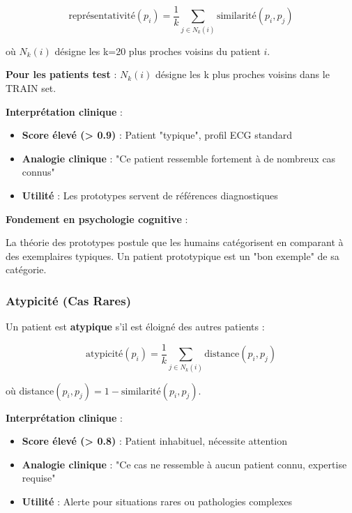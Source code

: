 \documentclass[12pt,a4paper]{article}
\begin{document}
\begin{equation}
\text{représentativité}(p_i) = \frac{1}{k} \sum_{j \in N_k(i)} \text{similarité}(p_i, p_j)
\end{equation}

où $N_k(i)$ désigne les k=20 plus proches voisins du patient $i$.

\textbf{Pour les patients test} : $N_k(i)$ désigne les k plus proches voisins dans le TRAIN set.

\textbf{Interprétation clinique} :

\begin{itemize}
    \item \textbf{Score élevé (> 0.9)} : Patient "typique", profil ECG standard
    \item \textbf{Analogie clinique} : "Ce patient ressemble fortement à de nombreux cas connus"
    \item \textbf{Utilité} : Les prototypes servent de références diagnostiques
\end{itemize}

\textbf{Fondement en psychologie cognitive} :

La théorie des prototypes \cite{rosch1973} postule que les humains catégorisent en comparant à des exemplaires typiques. Un patient prototypique est un "bon exemple" de sa catégorie.

\subsubsection{Atypicité (Cas Rares)}

Un patient est \textbf{atypique} s'il est éloigné des autres patients :

\begin{equation}
\text{atypicité}(p_i) = \frac{1}{k} \sum_{j \in N_k(i)} \text{distance}(p_i, p_j)
\end{equation}

où distance$(p_i, p_j) = 1 - \text{similarité}(p_i, p_j)$.

\textbf{Interprétation clinique} :

\begin{itemize}
    \item \textbf{Score élevé (> 0.8)} : Patient inhabituel, nécessite attention
    \item \textbf{Analogie clinique} : "Ce cas ne ressemble à aucun patient connu, expertise requise"
    \item \textbf{Utilité} : Alerte pour situations rares ou pathologies complexes
\end{itemize}
\end{document}
